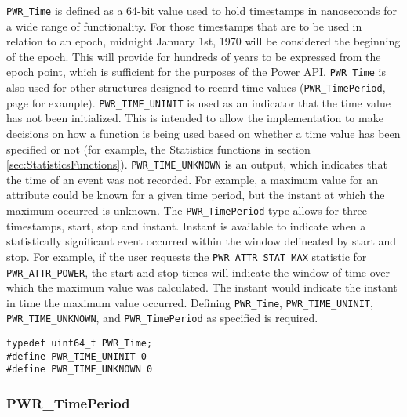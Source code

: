 \texttt{PWR_Time} is defined as a 64-bit value used to hold timestamps in nanoseconds for a wide range of functionality. 
For those timestamps that are to be used in relation to an epoch, midnight January 1st, 1970 will be considered the beginning of the epoch.
This will provide for hundreds of years to be expressed from the epoch point, which is sufficient for the purposes of the Power API.
\texttt{PWR_Time} is also used for other structures designed to record time values (\texttt{PWR_TimePeriod}, page \pageref{type:TimePeriod} for example). 
\texttt{PWR_TIME_UNINIT} is used as an indicator that the time value has not been initialized. 
This is intended to allow the implementation to make decisions on how a function is being used based on whether a time value has been specified or not (for example, the Statistics functions in section \ref{sec:StatisticsFunctions}).
\texttt{PWR_TIME_UNKNOWN} is an output, which indicates that the time of an event was not recorded. For example, a maximum value for an attribute could be known for a given time period, but the instant at which the maximum occurred is unknown.
The \texttt{PWR_TimePeriod} type allows for three timestamps, start, stop and instant. 
Instant is available to indicate when a statistically significant event occurred within the window delineated by start and stop.
For example, if the user requests the \texttt{PWR_ATTR_STAT_MAX} statistic for \texttt{PWR_ATTR_POWER}, the start and stop times will indicate the window of time over which the maximum value was calculated. 
The instant would indicate the instant in time the maximum value occurred.
Defining \texttt{PWR_Time}, \texttt{PWR_TIME_UNINIT}, \texttt{PWR_TIME_UNKNOWN}, and \texttt{PWR_TimePeriod} as specified is required.



\begin{center}
\begin{minipage}{.95\linewidth}%
\begin{lstlisting}
typedef uint64_t PWR_Time;
#define PWR_TIME_UNINIT 0
#define PWR_TIME_UNKNOWN 0 
\end{lstlisting}
\end{minipage}
\end{center}

\subsubsection{PWR_TimePeriod}\label{type:TimePeriod}


